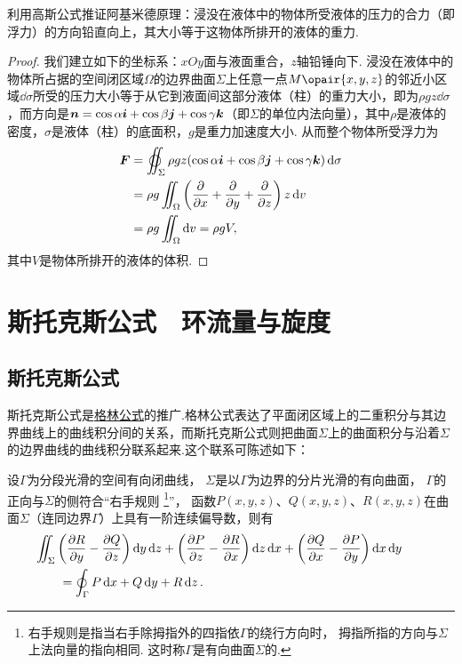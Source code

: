 \begin{example}
利用高斯公式推证阿基米德原理：浸没在液体中的物体所受液体的压力的合力（即浮力）的方向铅直向上，其大小等于这物体所排开的液体的重力.
\begin{proof}
我们建立如下的坐标系：\(xOy\)面与液面重合，\(z\)轴铅锤向下.
浸没在液体中的物体所占据的空间闭区域\(\Omega\)的边界曲面\(\Sigma\)上任意一点\(M\opair{x,y,z}\)的邻近小区域\(\dd{\sigma}\)所受的压力大小等于从它到液面间这部分液体（柱）的重力大小，即为\(\rho g z \dd{\sigma}\)，而方向是\(\boldsymbol{n}=\cos\alpha\boldsymbol{i}+\cos\beta\boldsymbol{j}+\cos\gamma\boldsymbol{k}\)（即\(\Sigma\)的单位内法向量），其中\(\rho\)是液体的密度，\(\sigma\)是液体（柱）的底面积，\(g\)是重力加速度大小.
从而整个物体所受浮力为\begin{align*}
\mat{F} &= \varoiint_{\Sigma} \rho g z (\cos\alpha\mat{i}+\cos\beta\mat{j}+\cos\gamma\mat{k}) \dd{\sigma} \\
&= \rho g \iint_{\Omega} \left(\pdv{x}+\pdv{y}+\pdv{z}\right) z \dd{v} \\
&= \rho g \iint_{\Omega} \dd{v}
= \rho g V,
\end{align*}其中\(V\)是物体所排开的液体的体积.
\end{proof}
\end{example}

\section{斯托克斯公式　环流量与旋度}
\subsection{斯托克斯公式}
斯托克斯公式是\hyperref[equation:线积分与面积分.格林公式]{格林公式}的推广.格林公式表达了平面闭区域上的二重积分与其边界曲线上的曲线积分间的关系，而斯托克斯公式则把曲面\(\Sigma\)上的曲面积分与沿着\(\Sigma\)的边界曲线的曲线积分联系起来.这个联系可陈述如下：

\begin{theorem}[斯托克斯公式]
设\(\Gamma\)为分段光滑的空间有向闭曲线，%
\(\Sigma\)是以\(\Gamma\)为边界的分片光滑的有向曲面，%
\(\Gamma\)的正向与\(\Sigma\)的侧符合“右手规则%
\footnote{右手规则是指当右手除拇指外的四指依\(\Gamma\)的绕行方向时，%
拇指所指的方向与\(\Sigma\)上法向量的指向相同.
这时称\(\Gamma\)是有向曲面\(\Sigma\)的.}”，%
函数\(P(x,y,z)\)、\(Q(x,y,z)\)、\(R(x,y,z)\)在曲面\(\Sigma\)（连同边界\(\Gamma\)）上具有一阶连续偏导数，则有
\begin{equation}\label{equation:线积分与面积分.斯托克斯公式}
\begin{split}
&\hspace{-20pt}\iint_{\Sigma}
	\left( \pdv{R}{y} - \pdv{Q}{z} \right)\dd{y}\dd{z}
	+\left( \pdv{P}{z} - \pdv{R}{x} \right)\dd{z}\dd{x}
	+\left( \pdv{Q}{x} - \pdv{P}{y} \right)\dd{x}\dd{y} \\
&= \oint_{\Gamma} P\dd{x}+Q\dd{y}+R\dd{z}.
\end{split}
\end{equation}
\end{theorem}

